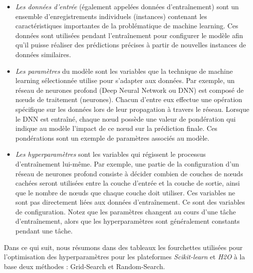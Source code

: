 \begin{itemize}

\item[\ding{224}]    \textit{Les données d'entrée} (également appelées données d'entraînement) sont un ensemble d'enregistrements individuels (instances) contenant les caractéristiques importantes de la problématique de machine learning. Ces données sont utilisées pendant l'entraînement pour configurer le modèle afin qu'il puisse réaliser des prédictions précises à partir de nouvelles instances de données similaires. \\

\item[\ding{224}]   \textit{Les paramètres} du modèle sont les variables que la technique de machine learning sélectionnée utilise pour s'adapter aux données. Par exemple, un réseau de neurones profond (Deep Neural Network ou DNN) est composé de nœuds de traitement (neurones). Chacun d'entre eux effectue une opération spécifique sur les données lors de leur propagation à travers le réseau. Lorsque le DNN est entraîné, chaque nœud possède une valeur de pondération qui indique au modèle l'impact de ce nœud sur la prédiction finale. Ces pondérations sont un exemple de paramètres associés au modèle. \\

\item[\ding{224}]     \textit{Les hyperparamètres} sont les variables qui régissent le processus d'entraînement lui-même. Par exemple, une partie de la configuration d'un réseau de neurones profond consiste à décider combien de couches de nœuds cachées seront utilisées entre la couche d'entrée et la couche de sortie, ainsi que le nombre de nœuds que chaque couche doit utiliser. Ces variables ne sont pas directement liées aux données d'entraînement. Ce sont des variables de configuration. Notez que les paramètres changent au cours d'une tâche d'entraînement, alors que les hyperparamètres sont généralement constants pendant une tâche.\\
\end{itemize}

Dans ce qui suit, nous résumons dans des tableaux les fourchettes utilisées pour l'optimisation des hyperparamètres pour les plateformes \textit{Scikit-learn} et \textit{H2O} à la base deux méthodes : Grid-Search et Random-Search. \\


